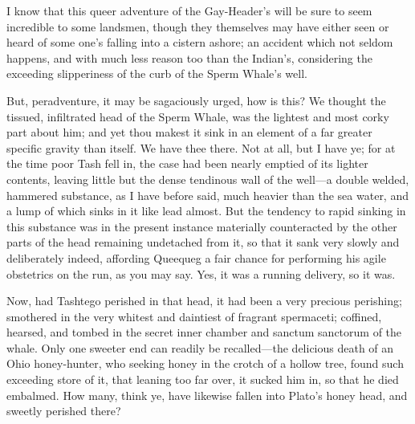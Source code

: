 \documentclass{article}
\begin{document}
I know that this queer adventure of the Gay-Header's will be sure to seem incredible to some landsmen, though they themselves may have either seen or heard of some one's falling into a cistern ashore; an accident which not seldom happens, and with much less reason too than the Indian's, considering the exceeding slipperiness of the curb of the Sperm Whale's well.

But, peradventure, it may be sagaciously urged, how is this? We thought the tissued, infiltrated head of the Sperm Whale, was the lightest and most corky part about him; and yet thou makest it sink in an element of a far greater specific gravity than itself. We have thee there. Not at all, but I have ye; for at the time poor Tash fell in, the case had been nearly emptied of its lighter contents, leaving little but the dense tendinous wall of the well—a double welded, hammered substance, as I have before said, much heavier than the sea water, and a lump of which sinks in it like lead almost. But the tendency to rapid sinking in this substance was in the present instance materially counteracted by the other parts of the head remaining undetached from it, so that it sank very slowly and deliberately indeed, affording Queequeg a fair chance for performing his agile obstetrics on the run, as you may say. Yes, it was a running delivery, so it was.

Now, had Tashtego perished in that head, it had been a very precious perishing; smothered in the very whitest and daintiest of fragrant spermaceti; coffined, hearsed, and tombed in the secret inner chamber and sanctum sanctorum of the whale. Only one sweeter end can readily be recalled—the delicious death of an Ohio honey-hunter, who seeking honey in the crotch of a hollow tree, found such exceeding store of it, that leaning too far over, it sucked him in, so that he died embalmed. How many, think ye, have likewise fallen into Plato's honey head, and sweetly perished there?
\end{document}
